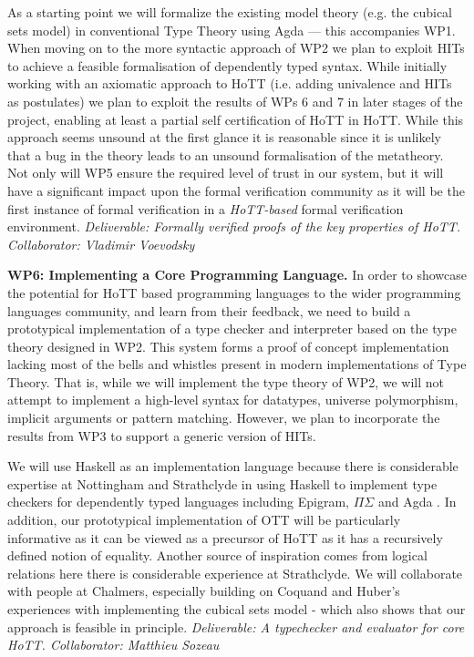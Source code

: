 \documentclass[a4paper,11pt]{article}
\begin{document}
As a starting point we will formalize the existing model theory
(e.g. the cubical sets model) in conventional Type Theory using Agda
--- this accompanies WP1. When moving on to the more syntactic
approach of WP2 we plan to exploit HITs to achieve a feasible
formalisation of dependently typed syntax. While initially working
with an axiomatic approach to HoTT (i.e. adding univalence and HITs as
postulates) we plan to exploit the results of WPs 6 and 7
in later stages of the project, enabling at least a partial self
certification of HoTT in HoTT.  While this approach seems unsound at
the first glance it is reasonable since it is unlikely that a bug in
the theory leads to an unsound formalisation of the metatheory.  Not
only will WP5 ensure the required level of trust in our system, but it
will have a significant impact upon the formal verification community
as it will be the first instance of formal verification in a {\em
  HoTT-based} formal verification environment. {\em Deliverable:
  Formally verified proofs of the key properties of
  HoTT. Collaborator: Vladimir Voevodsky}


{\bf WP6: Implementing a Core Programming Language.} In order to showcase
the potential for HoTT based programming languages to the wider
programming languages community, and learn from their feedback, we
need to build a prototypical implementation of a type checker and
interpreter based on the type theory designed in WP2.  This system
forms a proof of concept implementation lacking most of the bells
and whistles present in modern implementations of Type Theory. That
is, while we will implement the type theory of WP2, we will not
attempt to implement a high-level syntax for datatypes, universe
polymorphism, implicit arguments or pattern matching. However, we plan
to incorporate the results from WP3 to support a generic version of
HITs.

We will use Haskell as an implementation language because
there is considerable expertise at Nottingham and Strathclyde in using
Haskell to implement type checkers for dependently typed languages
including Epigram, $\Pi\Sigma$ and Agda
\cite{alti:checking,easy,alti:pisigma-new}.  In addition, our
prototypical implementation of OTT will be particularly informative as
it can be viewed as a precursor of HoTT as it has a recursively
defined notion of equality. Another source of inspiration comes from
logical relations
here there is considerable experience at Strathclyde.
We will collaborate with people at
Chalmers, especially building on Coquand and Huber's experiences with
implementing the cubical sets model - which also shows that our
approach is feasible in principle. {\em Deliverable: A typechecker and evaluator for 
  core HoTT. Collaborator: Matthieu Sozeau}
\end{document}
